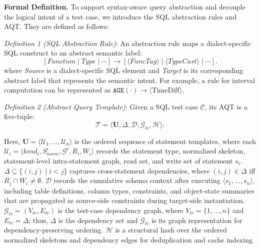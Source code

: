 \documentclass[conference]{IEEEtran}
\newtheorem{definition}{Definition}
\begin{document}
\textbf{Formal Definition.}
To support syntax-aware query abstraction and decouple the logical intent of a test case, we introduce the SQL abstraction rules and AQT. 
They are defined as follows:

\textit{Definition 1 (SQL Abstraction Rule)}: An abstraction rule maps a dialect-specific SQL construct to an abstract
semantic label:
\[
    [\textit{Function} \mid \textit{Type} \mid \cdots]
    \rightarrow
    [\langle \textit{FuncTag} \rangle \mid
     \langle \textit{TypeCast} \rangle \mid \cdots].
\]
where \textit{Source} is a dialect-specific SQL element and \textit{Target} is its corresponding abstract label that represents the semantic intent. For example, a rule for interval computation can be represented as $\texttt{AGE}(\cdot) \rightarrow \langle \text{TimeDiff} \rangle$.


\textit{Definition 2 (Abstract Query Template)}: Given a SQL test case $\mathcal{C}$, its AQT is a five-tuple:
\[
    \mathcal{T}=\langle \mathbf{U}, \Delta, \mathcal{D}, \mathcal{G}_{tc}, \mathcal{H} \rangle .
\]

Here, $\mathbf{U}=\langle \mathcal{U}_1,\ldots,\mathcal{U}_n\rangle$ is the ordered sequence of statement templates, where each $\mathcal{U}_i=\langle kind_i,S^i_{norm},\mathcal{G}^i,R_i,W_i\rangle$
records the statement type, normalized skeleton, statement-level intra-statement graph, read set, and write set of statement $s_i$.
$\Delta \subseteq \{(i,j)\mid i<j\}$ captures cross-statement dependencies, where $(i,j)\in\Delta$ iff $R_j\cap W_i\neq\emptyset$. 
$\mathcal{D}$ records the cumulative schema context after executing $\langle s_1,\ldots,s_n\rangle$, including table definitions, column types, constraints, and object-state summaries that are propagated as source-side
constraints during target-side instantiation.
$\mathcal{G}_{tc}=(V_{tc},E_{tc})$ is the test-case dependency graph, where $V_{tc}=\{1,\ldots,n\}$ and $E_{tc}=\Delta$; thus, $\Delta$ is the dependency set and 
$\mathcal{G}_{tc}$ is its graph representation for dependency-preserving ordering.
$\mathcal{H}$ is a structural hash over the ordered normalized skeletons and dependency edges for deduplication and cache indexing.
\end{document}
